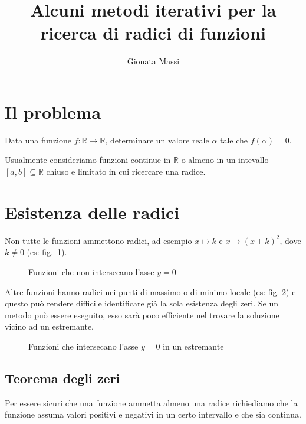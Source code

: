 \documentclass[12pt]{article}
\title{Alcuni metodi iterativi per la ricerca di radici di funzioni}
\author{Gionata Massi}
\date{} %
\theoremstyle{plain}%
\theoremstyle{definition}
\theoremstyle{remark}
\begin{document}
\maketitle

\thispagestyle{empty}%

\tableofcontents

\section{Il problema}

Data una funzione $f : \mathbb{R} \to \mathbb{R}$, determinare un valore reale $\alpha$ tale che $f(\alpha) = 0$.

Usualmente consideriamo funzioni continue in $\mathbb{R}$ o almeno in un intevallo $[a, b] \subseteq \mathbb{R}$ chiuso e limitato in cui ricercare una radice.

\section{Esistenza delle radici}

Non tutte le funzioni ammettono radici, ad esempio $x \mapsto k$ e $x \mapsto (x + k)^2$, dove $k \neq 0$ (es: fig.~\ref{fig:no_zeri}).

\begin{figure}[!htbp]
    \centering
    
    \caption{Funzioni che non intersecano l'asse $y = 0$}
    \label{fig:no_zeri}
\end{figure}
    
Altre funzioni hanno radici nei punti di massimo o di minimo locale (es: fig. \ref{fig:zero_estremante})
e questo può rendere difficile identificare già la sola esistenza degli zeri. Se un metodo può essere eseguito,
esso sarà poco efficiente nel trovare la soluzione vicino ad un estremante.

\begin{figure}[!htbp]
    \centering
    
    \caption{Funzioni che intersecano l'asse $y = 0$ in un estremante}
    \label{fig:zero_estremante}
\end{figure}

\subsection{Teorema degli zeri}

Per essere sicuri che una funzione ammetta almeno una radice richiediamo che la funzione assuma valori positivi e negativi in un certo intervallo e che sia continua.
\end{document}
